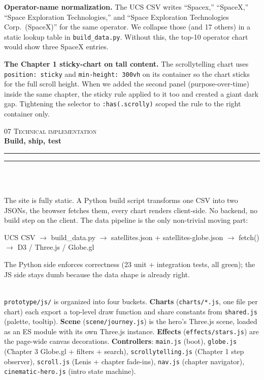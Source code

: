 \documentclass[9pt,a4paper]{article}
\newcommand{\eyebrow}[1]{{\footnotesize\textcolor{accentBlue}{\textsc{#1}}}}
\newcommand{\pageheader}[3]{%
  {\eyebrow{#1 \quad\textbullet\quad #2}}\\[3pt]%
  {\Large\bfseries #3}\\[3pt]%
  {\color{accentBlue}\rule{4em}{1.5pt}}\hspace{1pt}%
  {\color{accentBlue!28}\rule{\dimexpr\linewidth-4em-1pt\relax}{0.5pt}}\\[4pt]%
}
\newcommand{\subhead}[1]{%
  \vspace{4pt}%
  \noindent\tcbox[
    on line,
    colback=accentBlue!10!white, colframe=accentBlue,
    boxrule=0.3pt, arc=2.5pt,
    left=7pt, right=7pt, top=0.5pt, bottom=0.5pt,
  ]{\small\bfseries\color{accentBlue!85!black}#1}\\[2pt]%
}
\begin{document}
\textbf{Operator-name normalization.} The UCS CSV writes ``Spacex,'' ``SpaceX,'' ``Space Exploration Technologies,'' and ``Space Exploration Technologies Corp.\ (SpaceX)'' for the same operator. We collapse those (and 17 others) in a static lookup table in \texttt{build\_data.py}. Without this, the top-10 operator chart would show three SpaceX entries.

\textbf{The Chapter 1 sticky-chart on tall content.} The scrollytelling chart uses \texttt{position: sticky} and \texttt{min-height: 300vh} on its container so the chart sticks for the full scroll height. When we added the second panel (purpose-over-time) inside the same chapter, the sticky rule applied to it too and created a giant dark gap. Tightening the selector to \texttt{:has(.scrolly)} scoped the rule to the right container only.

\vspace{18pt}


\pageheader{07}{Technical implementation}{Build, ship, test}

\vspace{2pt}

\subhead{Architecture}

The site is fully static. A Python build script transforms one CSV into two JSONs, the browser fetches them, every chart renders client-side. No backend, no build step on the client. The data pipeline is the only non-trivial moving part:

\vspace{3pt}
\begin{center}
{\small\ttfamily
UCS CSV $\longrightarrow$ build\_data.py $\longrightarrow$ satellites.json + satellites-globe.json $\longrightarrow$ fetch() $\longrightarrow$ D3 / Three.js / Globe.gl
}
\end{center}
\vspace{3pt}

The Python side enforces correctness (23 unit + integration tests, all green); the JS side stays dumb because the data shape is already right.

\subhead{Module layout}

\texttt{prototype/js/} is organized into four buckets. \textbf{Charts} (\texttt{charts/*.js}, one file per chart) each export a top-level draw function and share constants from \texttt{shared.js} (palette, tooltip). \textbf{Scene} (\texttt{scene/journey.js}) is the hero's Three.js scene, loaded as an ES module with its own Three.js instance. \textbf{Effects} (\texttt{effects/stars.js}) are the page-wide canvas decorations. \textbf{Controllers}: \texttt{main.js} (boot), \texttt{globe.js} (Chapter 3 Globe.gl + filters + search), \texttt{scrollytelling.js} (Chapter 1 step observer), \texttt{scroll.js} (Lenis + chapter fade-ins), \texttt{nav.js} (chapter navigator), \texttt{cinematic-hero.js} (intro state machine).
\end{document}
